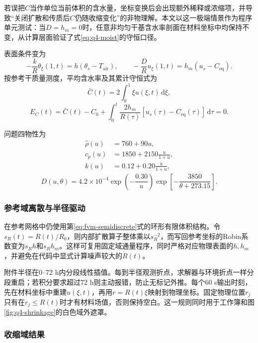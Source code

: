 若误把$C$当作单位当前体积的含水量，坐标变换后会出现额外稀释或浓缩项，并导致“关闭扩散和传质后$C$仍随收缩变化”的非物理解。本文以这一极端情景作为程序单元测试：当$D=h_m=0$时，任意非均匀干基含水率剖面在材料坐标中均保持不变，从计算层面验证了式\eqref{eq:q4-moist}的守恒口径。

表面条件变为
\begin{equation}
-\frac{k}{R}\theta_\xi(1,t)=h(\theta_s-T_{\mathrm{air}}),
\qquad
-\frac{D}{R}u_\xi(1,t)=h_m(u_s-C_{\mathrm{eq}}).
\label{eq:q4-bc}
\end{equation}
按参考干质量测度，平均含水率及其累计守恒式为
\begin{equation}
\bar C(t)=2\int_0^1\xi u(\xi,t)\,\mathrm d\xi,
\end{equation}
\begin{equation}
E_C(t)=\bar C(t)-C_0+
\int_0^t\frac{2h_m}{R(\tau)}[u_s(\tau)-C_{\mathrm{eq}}(\tau)]\,\mathrm d\tau=0.
\label{eq:q4-balance}
\end{equation}

问题四物性为
\begin{align}
\hat\rho(u)&=760+90u,\\
c_p(u)&=1850+2150\frac{u}{1+u},\\
k(u)&=0.12+0.20\frac{u}{1+u},
\end{align}
\begin{equation}
D(u,\theta)=4.2\times10^{-4}
\exp\left(-\frac{0.30}{u}\right)
\exp\left[-\frac{3850}{\theta+273.15}\right].
\label{eq:q4-D}
\end{equation}

\subsubsection{参考域离散与半径驱动}

在参考网格中仍使用第\ref{eq:fvm-semidiscrete}式的环形有限体积结构。令$s_R(t)=R(t)/R_0$，则内部扩散算子整体乘以$s_R^{-2}$，而写回参考坐标的Robin系数变为$s_Rh$和$s_Rh_m$。这样可复用固定域通量程序，同时严格对应物理表面的$h,h_m$，并避免在代码中显式计算噪声较大的$\dot R(t)$。

附件半径在0--72 h内分段线性插值。每到半径观测折点，求解器与环境折点一样分段重启；若积分要求超过72 h则主动报错，防止无标记外推。每个60 s输出时刻，先在材料坐标中重建$u(\xi,t)$，再用$r=R(t)\xi$映射到物理坐标。固定物理位置$r_j$只有在$r_j\le R(t)$时才有材料场值，否则保持空白。这一规则同时用于工作簿和图\ref{fig:q4-shrinkage}的白色域外遮罩。

\subsubsection{收缩域结果}

